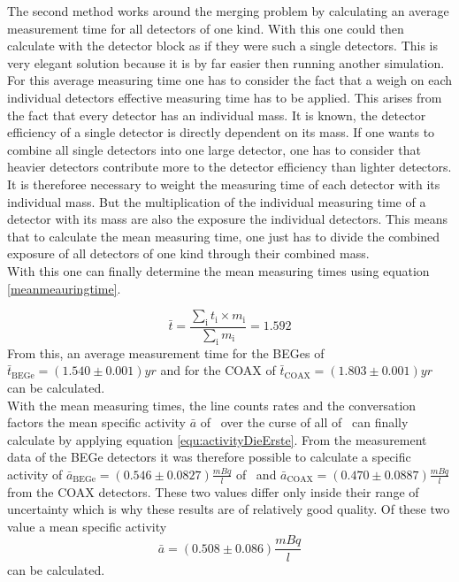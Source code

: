 \documentclass[encoding=utf8,british]{tumphthesis}
\begin{document}
The second method works around the merging problem by calculating an average measurement time for all detectors of one kind.
With this one could then calculate with the detector block as if they were such a single detectors.
This is very elegant solution because it is by far easier then running another simulation.
\\

For this average measuring time one has to consider the fact that a weigh on each individual detectors effective measuring time has to be applied.
This arises from the fact that every detector has an individual mass.
It is known, the detector efficiency of a single detector is directly dependent on its mass.
If one wants to combine all single detectors into one large detector, one has to consider that heavier detectors contribute more to the detector efficiency than lighter detectors.
It is thereforee necessary to weight the measuring time of each detector with its individual mass.
But the multiplication of the individual measuring time of a detector with its mass are also the exposure the individual detectors.
This means that to calculate the mean measuring time, one just has to divide the combined exposure of all detectors of one kind through their combined mass.
\\

With this one can finally determine the mean measuring times using equation \ref{meanmeauringtime}.

\begin{equation*}
    \bar{t} = \frac{\sum_\mathrm{i} t_\mathrm{i} \times m_\mathrm{i}}{\sum_\mathrm{i} m_\mathrm{i}} = 1.592
\label{meanmeauringtime}
\end{equation*}
From this, an average measurement time for the BEGes of $\bar{t}_{\mathrm{BEGe}} = (1.540\pm0.001)\unit{yr}$ and for the COAX of $\bar{t}_{\mathrm{COAX}} = (1.803\pm0.001)\unit{yr}$ can be calculated.
\\

With the mean measuring times, the line counts rates and the conversation factors the mean specific activity $\bar{a}$ of \Kr\ over the curse of all of \PII\ can  finally calculate  by applying equation \ref{equ:activityDieErste}.
From the measurement data of the BEGe detectors it was therefore possible to calculate a specific activity of $\bar{a}_{\mathrm{BEGe}} = (0.546\pm0.0827)	\frac{\unit{mBq}}{\unit{l}}$ of \Kr\ and $\bar{a}_{\mathrm{COAX}} = (0.470\pm0.0887)	\frac{\unit{mBq}}{\unit{l}}$ from the COAX detectors.
These two values differ only inside their range of uncertainty which is why these results are of relatively good quality.
Of these two value a mean specific activity 
\begin{equation*}
\bar{a} = (0.508\pm0.086)\frac{\unit{mBq}}{\unit{l}}
\end{equation*}
can be calculated.
\\
\end{document}
